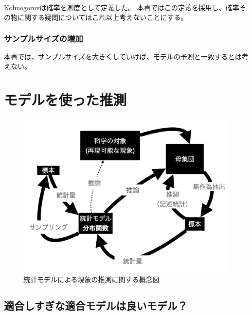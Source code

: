 Kolmogorovは確率を測度として定義した。
本書ではこの定義を採用し、確率その物に関する疑問についてはこれ以上考えないことにする。

\subsubsection{サンプルサイズの増加}
本書では、サンプルサイズを大きくしていけば、モデルの予測と一致するとは考えない。


\section{モデルを使った推測}



\begin{figure}
 \begin{center}
  \includegraphics[bb=0 0 1024 768,width=15cm]{./image/01_/conceptual_diagram/conceptual_diagram.002.png}
  \caption{統計モデルによる現象の推測に関する概念図}
  \label{fig:conceptual_diagram_statistics}
 \end{center}
\end{figure}




\subsection{適合しすぎな適合モデルは良いモデル？}%

